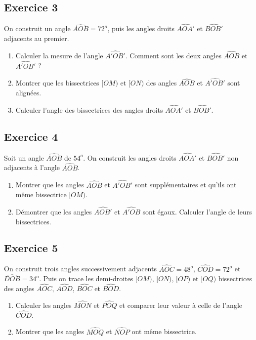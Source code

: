 \documentclass[12 pt]{extarticle}
\theoremstyle{plain}
\begin{document}
\subsection*{Exercice 3}
On construit un angle $\widehat{AOB}= 72^o$, puis les angles droits $\widehat{AOA'}$ et $\widehat{BOB'}$ adjacents au premier. 
\begin{enumerate}
\item Calculer la mesure de l'angle $\widehat{A'OB'}$. Comment sont les deux angles $\widehat{AOB}$ et $\widehat{A'OB'}$ ? 
\item Montrer que les bissectrices $[OM)$ et $[ON)$ des angles $\widehat{AOB}$ et $\widehat{A'OB'}$ sont alignées.
\item Calculer l'angle des bissectrices des angles droits $\widehat{AOA'}$ et $\widehat{BOB'}$.
\end{enumerate}

\subsection*{Exercice 4}
Soit un angle $\widehat{AOB}$ de $54^o$. On construit les angles droits $\widehat{AOA'}$ et $\widehat{BOB'}$ non adjacents à l'angle $\widehat{AOB}$.\begin{enumerate}
\item Montrer que les angles $\widehat{AOB}$ et $\widehat{A'OB'}$ sont supplémentaires et qu'ils ont même bissectrice $[OM)$.
\item Démontrer que les angles $\widehat{AOB'}$ et $\widehat{A'OB}$ sont égaux. Calculer l'angle de leurs bissectrices.
\end{enumerate}

\subsection*{Exercice 5}

On construit trois angles successivement adjacents 
$\widehat{AOC} = 48^o$, $\widehat{COD}= 72^o$ et $\widehat{DOB}= 34^o$. Puis on trace les demi-droites $[OM)$, $[ON)$, $[OP)$ et $[OQ)$ bissectrices des angles $\widehat{AOC}$, $\widehat{AOD}$, $\widehat{BOC}$ et $\widehat{BOD}$. \begin{enumerate}
\item Calculer les angles $\widehat{MON}$ et $\widehat{POQ}$ et comparer leur valeur à celle de l'angle $\widehat{COD}$.
\item Montrer que les angles $\widehat{MOQ}$ et $\widehat{NOP}$ ont même bissectrice. 
\end{enumerate}



 	
\end{document}
